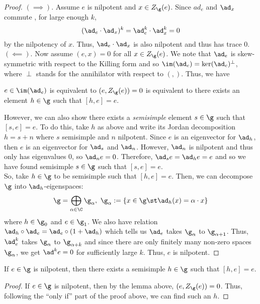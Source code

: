 \documentclass[springer-theory-notes.tex]{subfiles}
\begin{document}
\begin{proof}
  \((\implies)\). Assume \(e\) is nilpotent and \(x \in Z_\g(e)\). Since \(ad_e\) and
  \(\ad_x\) commute , for large enough \(k\), \[
    (\ad_e \cdot \ad_x)^k = \ad^k_e \cdot \ad^k_x = 0
  \]
  by the nilpotency of \(x\). Thus, \(\ad_e \cdot \ad_x\) is also
  nilpotent and thus has trace \(0\). \\

  \((\impliedby)\). Now assume \((e,x) = 0\) for all \(x \in
  Z_\g(e)\). We note that \(\ad_e\) is 
  skew-symmetric with respect to the Killing form and so
  \(\im(\ad_e) = \ker (\ad_e)^\perp\), where \(\perp\) stands for
  the annihilator with respect to \((,)\). Thus, we have
  \begin{lem}
    \(e \in
  \im(\ad_e)\) is equivalent to \((e,Z_\g(e)) = 0\) is equivalent to
  there exists an 
  element \(h \in \g\) such that \([h,e]=e\).
  \end{lem}
  However, we can also show there exists a \emph{semisimple} element
  \(s \in \g\) such that \([s,e] = e\). To do this, take \(h\) as
  above and write its Jordan decomposition \(h = s + n\) where \(s\)
  semisimple and \(n\) nilpotent. Since \(e\) is an eigenvector for
  \(\ad_h\), then \(e\) is an eigenvector for \(\ad_s\) and
  \(\ad_n\). However, \(\ad_n\) is nilpotent and thus only has
  eigenvalues \(0\), so \(\ad_n e = 0\). Therefore, \(\ad_s e = \ad_h
  e = e\) and so we have found semisimple \(s \in \g\) such that
  \([s,e] = e\). \\

  So, take \(h \in \g\) to be semisimple such that \([h,e] =
  e\). Then, we can decompose \(\g\) into \(\ad_h\)-eigenspaces: \[
    \g = \bigoplus_{\alpha \in \C} \g_\alpha, \ \g_\alpha := \{x \in
    \g \st \ad_h(x) = \alpha \cdot x\}
  \]
  where \(h \in \g_0\) and \(e \in \g_1\). We also have relation
  \(\ad_h \circ \ad_e = \ad_e \circ (1+\ad_h)\) which tells us
  \(\ad_e\) takes \(\g_\alpha\) to \(\g_{\alpha+1}\). Thus,
  \(\ad^k_e\) takes \(\g_\alpha\) to \(\g_{\alpha+k}\) and since there
  are only finitely many non-zero spaces \(\g_\alpha\), we get \(\ad^k
  e = 0\) for sufficiently large \(k\). Thus, \(e\) is nilpotent.
\end{proof}
\begin{lem}
  If \(e \in \g\) is nilpotent, then there exists a semisimple \(h \in
  \g\) such that \([h,e] = e\).
\end{lem}
\begin{proof}
  If \(e \in \g\) is nilpotent, then by the lemma above, \((e,
  Z_\g(e)) = 0\). Thus, following the ``only if'' part of the proof
  above, we can find such an \(h\).
\end{proof}
\end{document}
